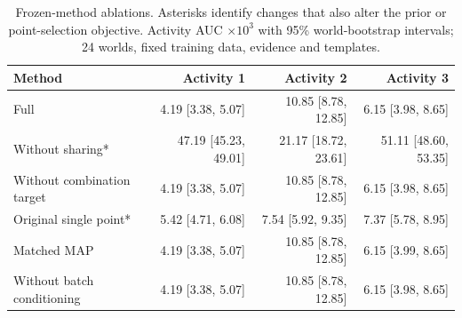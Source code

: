 \begin{table}[tbp]
\centering
\caption{Frozen-method ablations. Asterisks identify changes that also alter the prior or point-selection objective. Activity AUC $\times10^3$ with 95\% world-bootstrap intervals; 24 worlds, fixed training data, evidence and templates.}
\label{tab:ablations}
\scriptsize
\setlength{\tabcolsep}{3pt}
\begin{tabular}{lrrr}
\toprule
Method & Activity 1 & Activity 2 & Activity 3 \\
\midrule
Full & 4.19 [3.38, 5.07] & 10.85 [8.78, 12.85] & 6.15 [3.98, 8.65] \\
Without sharing* & 47.19 [45.23, 49.01] & 21.17 [18.72, 23.61] & 51.11 [48.60, 53.35] \\
Without combination target & 4.19 [3.38, 5.07] & 10.85 [8.78, 12.85] & 6.15 [3.98, 8.65] \\
Original single point* & 5.42 [4.71, 6.08] & 7.54 [5.92, 9.35] & 7.37 [5.78, 8.95] \\
Matched MAP & 4.19 [3.38, 5.07] & 10.85 [8.78, 12.85] & 6.15 [3.99, 8.65] \\
Without batch conditioning & 4.19 [3.38, 5.07] & 10.85 [8.78, 12.85] & 6.15 [3.98, 8.65] \\
\bottomrule
\end{tabular}
\end{table}
